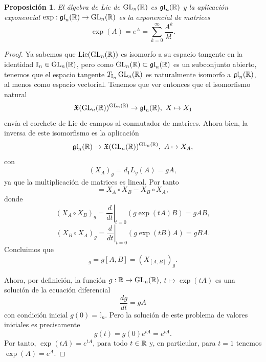 \documentclass[11pt,a4paper]{amsbook}
\newtheorem{prop}[subsection]{Proposición}
\theoremstyle{remark} \newtheorem{rmk}[subsection]{Observación}
\theoremstyle{definition} \newtheorem{defn}[subsection]{Definición}
\theoremstyle{definition} \newtheorem{ex}[subsection]{Ejemplo}
\theoremstyle{definition} \newtheorem{ej}[subsection]{Ejercicio}
\begin{document}
\begin{prop}
El álgebra de Lie de $\operatorname{GL}_n(\mathbb R)$ es $\mathfrak{gl}_n(\mathbb R)$ y la aplicación exponencial $\exp:\mathfrak{gl}_n(\mathbb R)\rightarrow \operatorname{GL}_n(\mathbb R)$ es la exponencial de matrices
\begin{equation*}
\exp(A) = e^A = \sum_{k=0}^\infty \frac{A^k}{k!}.
\end{equation*}

\end{prop}
\begin{proof}
Ya sabemos que $\mathrm{Lie}(\operatorname{GL}_n(\mathbb R))$ es isomorfo a su espacio tangente en la identidad $\mathbb{I}_n \in \operatorname{GL}_n(\mathbb R)$, pero como $\operatorname{GL}_n(\mathbb R)\subset \mathfrak{gl}_n(\mathbb R)$ es un subconjunto abierto, tenemos que el espacio tangente $T_{\mathbb{I}_n} \operatorname{GL}_n(\mathbb R)$ es naturalmente isomorfo a $\mathfrak{gl}_n(\mathbb R)$, al menos como espacio vectorial. Tenemos que ver entonces que el isomorfismo natural
\begin{equation*}
\mathfrak X(\operatorname{GL}_n(\mathbb R))^{\operatorname{GL}_n(\mathbb R)} \rightarrow \mathfrak{gl}_n(\mathbb R), \ X\mapsto X_1
\end{equation*}
envía el corchete de Lie de campos al conmutador de matrices. Ahora bien, la inversa de este isomorfismo es la aplicación
\begin{equation*}
\mathfrak{gl}_n(\mathbb R)\rightarrow \mathfrak X(\operatorname{GL}_n(\mathbb R))^{\operatorname{GL}_n(\mathbb R)}, \ A \mapsto X_A,
\end{equation*}
con
\begin{equation*}
(X_A)_g = d_1 L_g (A) = gA,
\end{equation*}
ya que la multiplicación de matrices es lineal.
Por tanto
\begin{equation*}
[X_A,X_B] = X_A\circ X_B - X_B\circ X_A,
\end{equation*}
donde
\begin{equation*}
(X_A \circ X_B)_g = \left. \frac{d}{dt} \right|_{t=0} (g\exp(tA) B) = gAB,
\end{equation*}
\begin{equation*}
(X_B \circ X_A)_g = \left. \frac{d}{dt} \right|_{t=0} (g\exp(tB) A) = gBA.
\end{equation*}
Concluimos que
\begin{equation*}
[X_A,X_B]_g = g [A,B] = (X_{[A,B]})_g .
\end{equation*}

Ahora, por definición, la función $g:\mathbb R \rightarrow \operatorname{GL}_n(\mathbb R)$, $t \mapsto \exp(tA)$ es una solución de la ecuación diferencial
\begin{equation*}
\frac{dg}{dt} = g A
\end{equation*}
con condición inicial $g(0)=\mathbb{I}_n$. Pero la solución de este problema de valores iniciales es precisamente
\begin{equation*}
g(t)=g(0) e^{tA} = e^{tA}.
\end{equation*}
Por tanto, $\exp(tA)=e^{tA}$, para todo $t\in \mathbb R$ y, en particular, para $t=1$ tenemos $\exp(A)=e^A$.
\end{proof}
\end{document}
